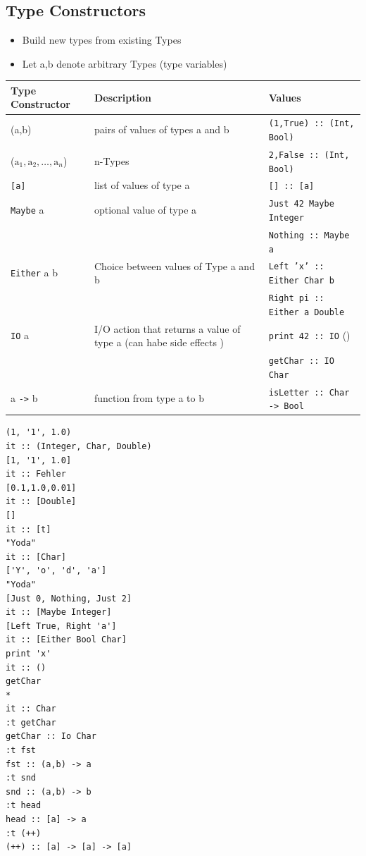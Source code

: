 \documentclass{article}
\newcommand{\Haskell}[1]{\texttt{#1}}
\begin{document}
\subsection{Type Constructors}
\begin{itemize}
\item Build new types from existing Types
\item Let a,b denote arbitrary Types (type variables)
\end{itemize}
\begin{tabular}{lp{6cm}l}
Type Constructor& Description & Values\\
\hline
(a,b)&pairs of values of types a and b& \Haskell{(1,True) :: (Int, Bool)}\\
($\text{a}_1,\text{a}_2,\ldots,\text{a}_n$)& n-Types& \Haskell{2,False :: (Int, Bool)}\\
\Haskell{[a]} &list of values of type a & \Haskell{[] :: [a]}\\
\Haskell{Maybe} a & optional value of type a & \Haskell{Just 42 Maybe Integer}\\
& & \Haskell{Nothing :: Maybe a}\\
\Haskell{Either} a b & Choice between values of Type a and b& \Haskell{Left 'x' :: Either Char b}\\
& & \Haskell{Right pi :: Either a Double}\\
\Haskell{IO} a & I/O action that returns a value of type a (can habe side effects ) & \Haskell{print 42 :: IO} ()\\
& & \Haskell{getChar :: IO Char}\\
a \Haskell{->} b & function from type a to b & \Haskell{isLetter :: Char -> Bool}
\end{tabular}
\begin{verbatim}
(1, '1', 1.0)
it :: (Integer, Char, Double)
[1, '1', 1.0]
it :: Fehler
[0.1,1.0,0.01] 
it :: [Double]
[]
it :: [t]
"Yoda"
it :: [Char]
['Y', 'o', 'd', 'a']
"Yoda"
[Just 0, Nothing, Just 2] 
it :: [Maybe Integer]
[Left True, Right 'a']
it :: [Either Bool Char]
print 'x' 
it :: ()
getChar
*
it :: Char
:t getChar
getChar :: Io Char
:t fst 
fst :: (a,b) -> a
:t snd
snd :: (a,b) -> b
:t head
head :: [a] -> a
:t (++)
(++) :: [a] -> [a] -> [a]
\end{verbatim}
\end{document}
